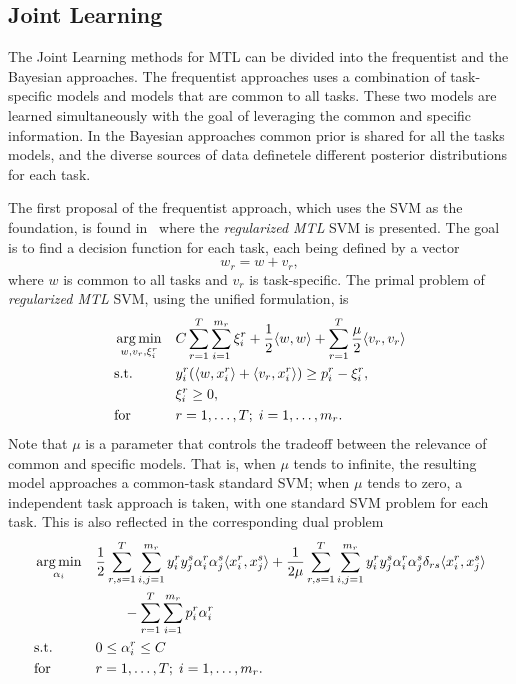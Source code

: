 \subsection{Joint Learning}
The Joint Learning methods for MTL can be divided into the frequentist and the Bayesian approaches.
The frequentist approaches uses a combination of task-specific models and models that are common to all tasks. These two models are learned simultaneously with the goal of leveraging the common and specific information.
In the Bayesian approaches common prior is shared for all the tasks models, and the diverse sources of data definetele different posterior distributions for each task.

The first proposal of the frequentist approach, which uses the SVM as the foundation, is found in~\cite{EvgeniouP04} where the \emph{regularized MTL} SVM is presented. The goal is to find a decision function for each task, each being defined by a vector
$$w_r = w + v_r,$$
where $w$ is common to all tasks and $v_r$ is task-specific.
The primal problem of \emph{regularized MTL} SVM, using the unified formulation, is 
\begin{equation}
    \label{eq:regmtlsvm_primal}
    \begin{aligned}
        & \argmin_{w, v_r, \xi_i^r}
        & & C \sum_{r=1}^\ntasks \sum_{i=1}^{\npertask_r} \xi_i^r + \frac{1}{2} \dotp{w}{w} + \sum_{r=1}^\ntasks \frac{\mu}{2} \dotp{v_r}{v_r} \\
        & \text{s.t.}
        & & y_{i}^r ( \dotp{w}{x_{i}^r} + \dotp{v_r}{x_{i}^r}) \geq p_i^r - \xi_i^r ,\\
        & & &\xi_i^r \geq 0, \\
        & \text{for } & & r=1, \ldots, \ntasks; \; i=1, \ldots, \npertask_r.
    \end{aligned}
\end{equation}
Note that $\mu$ is a parameter that controls the tradeoff between the relevance of common and specific models. That is, when $\mu$ tends to infinite, the resulting model approaches a common-task standard SVM; when $\mu$ tends to zero, a independent task approach is taken, with one standard SVM problem for each task.
This is also reflected in the corresponding dual problem
\begin{equation}\label{eq:regmtlsvm_dual}
    \begin{aligned}
        & \argmin_{\alpha_i} 
        & & \frac{1}{2} \sum_{r, s=1}^\ntasks \sum_{i, j=1}^{\npertask_r} y_i^r y_j^s \alpha_i^r \alpha_j^s \dotp{x_i^r}{x_j^s} + \frac{1}{2 \mu} \sum_{r, s=1}^\ntasks  \sum_{i, j=1}^{\npertask_r} y_i^r y_j^s \alpha_i^r \alpha_j^s \delta_{rs} \dotp{x_i^r}{x_j^s} \\
        & & & \qquad - \sum_{r=1}^\ntasks \sum_{i=1}^{\npertask_r} p_i^r \alpha_i^r \\
        & \text{s.t.}
        & & 0 \leq \alpha_i^r \leq C \\
        & \text{for } & & r=1, \ldots, \ntasks; \; i=1, \ldots, \npertask_r.
        \end{aligned}
\end{equation}
